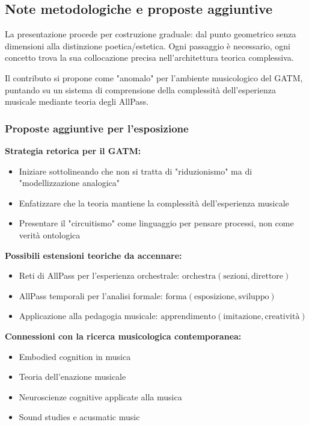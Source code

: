 \subsection{Note metodologiche e proposte aggiuntive}

La presentazione procede per costruzione graduale: dal punto geometrico senza dimensioni alla distinzione poetica/estetica. Ogni passaggio è necessario, ogni concetto trova la sua collocazione precisa nell'architettura teorica complessiva.

Il contributo si propone come "anomalo" per l'ambiente musicologico del GATM, puntando su un sistema di comprensione della complessità dell'esperienza musicale mediante teoria degli AllPass.

\subsubsection{Proposte aggiuntive per l'esposizione}

\textbf{Strategia retorica per il GATM:}
\begin{itemize}
\item Iniziare sottolineando che non si tratta di "riduzionismo" ma di "modellizzazione analogica"
\item Enfatizzare che la teoria mantiene la complessità dell'esperienza musicale
\item Presentare il "circuitismo" come linguaggio per pensare processi, non come verità ontologica
\end{itemize}

\textbf{Possibili estensioni teoriche da accennare:}
\begin{itemize}
\item Reti di AllPass per l'esperienza orchestrale: $\text{orchestra}(\text{sezioni},\text{direttore})$
\item AllPass temporali per l'analisi formale: $\text{forma}(\text{esposizione},\text{sviluppo})$
\item Applicazione alla pedagogia musicale: $\text{apprendimento}(\text{imitazione},\text{creatività})$
\end{itemize}

\textbf{Connessioni con la ricerca musicologica contemporanea:}
\begin{itemize}
\item Embodied cognition in musica
\item Teoria dell'enazione musicale
\item Neuroscienze cognitive applicate alla musica
\item Sound studies e acusmatic music
\end{itemize}
